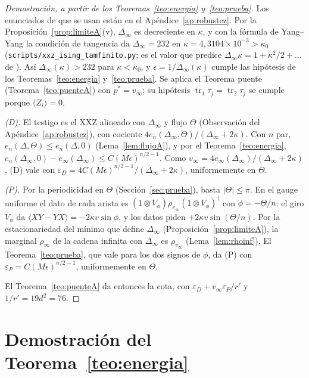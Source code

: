 \documentclass[11pt,a4paper]{article}
\theoremstyle{remark}
\newcommand{\tr}{\operatorname{tr}}
\newcommand{\ev}[1]{\langle #1\rangle}
\begin{document}
\begin{proof}[Demostración, a partir de los Teoremas~\ref{teo:energia} y~\ref{teo:prueba}]
Los enunciados de \cite{robustez} que se usan están en el Apéndice~\ref{ap:robustez}. Por la
Proposición~\ref{prop:limiteA}(v), $\Delta_\infty$ es decreciente en $\kappa$, y con la fórmula de
Yang--Yang la condición de tangencia da $\Delta_\infty=232$ en $\kappa=4{,}3104\times10^{-3}>\kappa_0$
(\texttt{scripts/xxz\_ising\_tamfinito.py}; es el valor que predice
$\Delta_\infty\kappa=1+\kappa^2/2+\dots$ de \cite[Prop.~17(vi)]{robustez}). Así $\Delta_\infty(\kappa)>232$
para $\kappa<\kappa_0$, y $\epsilon=1/\Delta_\infty(\kappa)$ cumple las hipótesis de los
Teoremas~\ref{teo:energia} y~\ref{teo:prueba}. Se aplica el Teorema puente
(Teorema~\ref{teo:puenteA}) con $p^\ast=v_\infty$; su hipótesis $\tr_1\tau_j=\tr_2\tau_j$ se cumple porque $\ev{Z_i}=0$.

\emph{(D).} El testigo es el XXZ alineado con $\Delta_\infty$ y flujo $\Theta$ (Observación del
Apéndice~\ref{ap:robustez}), con cociente
$4e_n(\Delta_\infty,\Theta)/(\Delta_\infty+2\kappa)$. Con $n$ par,
$e_n(\Delta,\Theta)\le e_n(\Delta,0)$ (Lema~\ref{lem:flujoA}), y por el
Teorema~\ref{teo:energia}, $e_n(\Delta_\infty,0)-e_\infty(\Delta_\infty)\le C(M\epsilon)^{n/2-1}$. Como
$v_\infty=4e_\infty(\Delta_\infty)/(\Delta_\infty+2\kappa)$, (D) vale con
$\varepsilon_D=4C(M\epsilon)^{n/2-1}/(\Delta_\infty+2\kappa)$, uniformemente en $\Theta$.

\emph{(P).} Por la periodicidad en $\Theta$ (Sección~\ref{sec:prueba}), basta $|\Theta|\le\pi$. En el gauge uniforme el dato de cada arista es $(1\otimes V_\phi)\rho_{v_\infty}(1\otimes V_\phi)^\dagger$
con $\phi=-\Theta/n$: el giro $V_\phi$ da $\ev{XY-YX}=-2\kappa v\sin\phi$, y los datos piden
$+2\kappa v\sin(\Theta/n)$. Por la estacionariedad del mínimo que define $\Delta_\infty$
(Proposición~\ref{prop:limiteA}), la marginal $\rho_\infty$ de la cadena infinita con $\Delta_\infty$ es
$\rho_{v_\infty}$ (Lema~\ref{lem:rhoinf}). El Teorema~\ref{teo:prueba}, que vale para los dos signos de
$\phi$, da (P) con $\varepsilon_P=C(M\epsilon)^{n/2-1}$, uniformemente en $\Theta$.

El Teorema~\ref{teo:puenteA} da entonces la cota, con $\varepsilon_D+v_\infty\varepsilon_P/r'$ y
$1/r'=19d^2=76$.
\end{proof}

\section{Demostración del Teorema~\ref{teo:energia}}\label{sec:energia}
\end{document}
